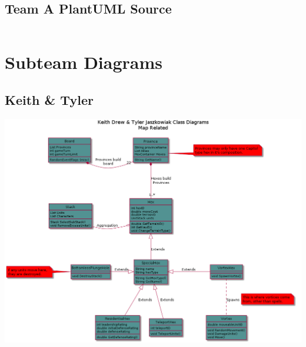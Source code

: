 \documentclass[10pt,a4paper]{article}
\begin{document}
\subsection{Team A PlantUML Source}
\begin{verbatim}

\end{verbatim}

\section{Subteam Diagrams}
\subsection{Keith & Tyler}
\includegraphics[width=\textwidth]{classD}
\end{document}
